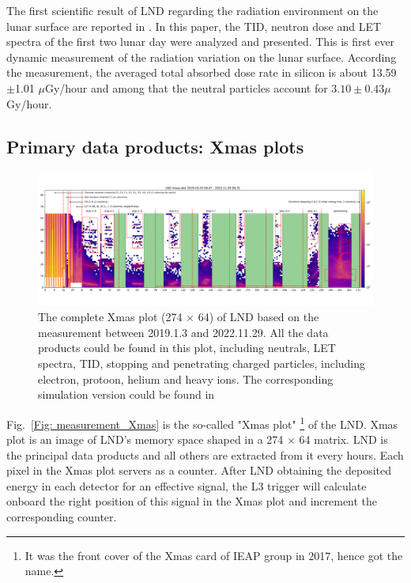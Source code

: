 The first scientific result of \ac{LND} regarding the radiation environment on the lunar surface are reported in \citep{Zhang-2020-LND-firstresults}. In this paper, the \ac{TID}, neutron dose and \ac{LET} spectra of the first two lunar day were analyzed and presented. This is first ever dynamic measurement of the radiation variation on the lunar surface. According the measurement, the averaged total absorbed dose rate in silicon is about 13.59$\pm$1.01 $\mu$Gy/hour and among that the neutral particles account for $3.10 \pm 0.43 \mu$Gy/hour. 



\subsection{Primary data products: Xmas plots}
\begin{figure}
    \centerfloat
    \includegraphics[width =\textheight, height = 0.6\textheight, angle = 90]{images/xmas-2019-01-03To2022-11-29.png}
    \caption[LND Xmas plot based on the measurement between 2019.1.3 and 2022.11.29]{The complete Xmas plot (274 $\times$ 64) of LND based on the measurement between 2019.1.3 and 2022.11.29. All the data products could be found in this plot, including neutrals, \ac{LET} spectra, \ac{TID}, stopping and penetrating charged particles, including electron, protoon, helium and heavy ions. The corresponding simulation version could be found in \citep{Wimmer2020SSRv}}
    \label{Fig:measurement_Xmas}
\end{figure}
\clearpage
Fig.~\ref{Fig: measurement_Xmas} is the so-called "Xmas plot" \footnote{It was the front cover of the Xmas card of IEAP group in 2017, hence got the name.} of the LND. Xmas plot is an image of \ac{LND}'s memory space shaped in a 274 $\times$ 64 matrix. LND is the principal data products and all others are extracted from it every hours. Each pixel in the Xmas plot servers as a counter. After LND obtaining the deposited energy in each detector for an effective signal, the L3 trigger will calculate onboard the right position of this signal in the Xmas plot and increment the corresponding counter. 

